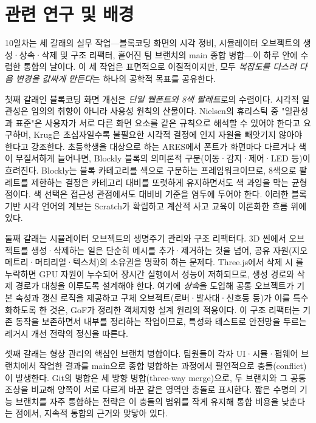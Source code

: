 \section{관련 연구 및 배경}

10일차는 세 갈래의 실무 작업—블록코딩 화면의 시각 정비, 시뮬레이터 오브젝트의 생성·상속·삭제 및 구조 리팩터, 흩어진 팀 브랜치의 main 종합 병합—이 하루 안에 수렴한 통합의 날이다. 이 세 작업은 표면적으로 이질적이지만, 모두 \emph{복잡도를 다스려 다음 변경을 값싸게 만든다}는 하나의 공학적 목표를 공유한다.

첫째 갈래인 블록코딩 화면 개선은 \emph{단일 웹폰트와 8색 팔레트}로의 수렴이다. 시각적 일관성은 임의의 취향이 아니라 사용성 원칙의 산물이다. Nielsen의 휴리스틱 중 "일관성과 표준"은 사용자가 서로 다른 화면 요소를 같은 규칙으로 해석할 수 있어야 한다고 요구하며\cite{nielsen1994heuristics,nielsen1993usability}, Krug은 초심자일수록 불필요한 시각적 결정에 인지 자원을 빼앗기지 않아야 한다고 강조한다\cite{krug2014dontmakemethink}. 초등학생을 대상으로 하는 ARES에서 폰트가 화면마다 다르거나 색이 무질서하게 늘어나면, Blockly 블록의 의미론적 구분(이동·감지·제어·LED 등)이 흐려진다. Blockly는 블록 카테고리를 색으로 구분하는 프레임워크이므로\cite{blockly}, 8색으로 팔레트를 제한하는 결정은 카테고리 대비를 또렷하게 유지하면서도 색 과잉을 막는 균형점이다. 색 선택은 접근성 관점에서도 대비비 기준을 염두에 두어야 한다\cite{wcag21}. 이러한 블록 기반 시각 언어의 계보는 Scratch가 확립하고 계산적 사고 교육이 이론화한 흐름 위에 있다\cite{maloney2010scratch,resnick2009scratch,brennan2012ct}.

둘째 갈래는 시뮬레이터 오브젝트의 생명주기 관리와 구조 리팩터다. 3D 씬에서 오브젝트를 생성·삭제하는 일은 단순히 메시를 추가·제거하는 것을 넘어, 공유 자원(지오메트리·머티리얼·텍스처)의 소유권을 명확히 하는 문제다. Three.js에서 삭제 시 를 누락하면 GPU 자원이 누수되어 장시간 실행에서 성능이 저하되므로\cite{threejs,webgl}, 생성 경로와 삭제 경로가 대칭을 이루도록 설계해야 한다. 여기에 \emph{상속}을 도입해 공통 오브젝트가 기본 속성과 갱신 로직을 제공하고 구체 오브젝트(로버·발사대·신호등 등)가 이를 특수화하도록 한 것은, GoF가 정리한 객체지향 설계 원리의 적용이다\cite{gof1994}. 이 구조 리팩터는 기존 동작을 보존하면서 내부를 정리하는 작업이므로, 특성화 테스트로 안전망을 두르는 레거시 개선 전략의 정신을 따른다\cite{feathers2004legacy,fowler2018refactoring}.

셋째 갈래는 형상 관리의 핵심인 브랜치 병합이다. 팀원들이 각자 UI·시뮬·펌웨어 브랜치에서 작업한 결과를 main으로 종합 병합하는 과정에서 필연적으로 충돌(conflict)이 발생한다. Git의 병합은 세 방향 병합(three-way merge)으로, 두 브랜치와 그 공통 조상을 비교해 양쪽이 서로 다르게 바꾼 같은 영역만 충돌로 표시한다\cite{chacon2014progit}. 짧은 수명의 기능 브랜치를 자주 통합하는 전략은 이 충돌의 범위를 작게 유지해 통합 비용을 낮춘다는 점에서, 지속적 통합의 근거와 맞닿아 있다\cite{beck2003tdd}.

